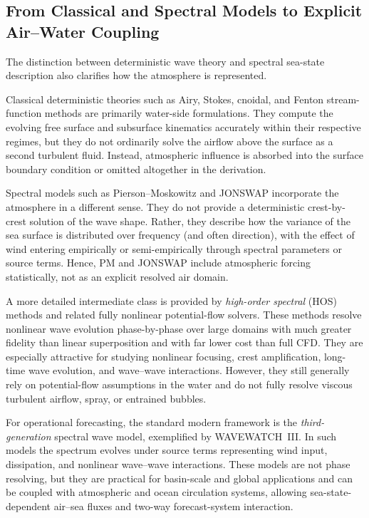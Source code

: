 \documentclass[journal,10pt,twocolumn]{IEEEtran}
\begin{document}
\subsection{From Classical and Spectral Models to Explicit Air--Water Coupling}
\label{sec:moderncoupling}

The distinction between deterministic wave theory and spectral sea-state description also
clarifies how the atmosphere is represented.

Classical deterministic theories such as Airy, Stokes, cnoidal, and Fenton stream-function
methods are primarily water-side formulations.
They compute the evolving free surface and subsurface kinematics accurately within their
respective regimes, but they do not ordinarily solve the airflow above the surface as a
second turbulent fluid.
Instead, atmospheric influence is absorbed into the surface boundary condition or omitted
altogether in the derivation.

Spectral models such as Pierson--Moskowitz and JONSWAP incorporate the atmosphere in a
different sense.
They do not provide a deterministic crest-by-crest solution of the wave shape.
Rather, they describe how the variance of the sea surface is distributed over frequency
(and often direction), with the effect of wind entering empirically or semi-empirically
through spectral parameters or source terms.
Hence, PM and JONSWAP include atmospheric forcing statistically, not as an explicit
resolved air domain.

A more detailed intermediate class is provided by \emph{high-order spectral} (HOS)
methods and related fully nonlinear potential-flow solvers.
These methods resolve nonlinear wave evolution phase-by-phase over large domains with much
greater fidelity than linear superposition and with far lower cost than full CFD.
They are especially attractive for studying nonlinear focusing, crest amplification,
long-time wave evolution, and wave--wave interactions.
However, they still generally rely on potential-flow assumptions in the water and do not
fully resolve viscous turbulent airflow, spray, or entrained bubbles.

For operational forecasting, the standard modern framework is the \emph{third-generation}
spectral wave model, exemplified by WAVEWATCH~III.
In such models the spectrum evolves under source terms representing wind input,
dissipation, and nonlinear wave--wave interactions.
These models are not phase resolving, but they are practical for basin-scale and global
applications and can be coupled with atmospheric and ocean circulation systems, allowing
sea-state-dependent air--sea fluxes and two-way forecast-system interaction.
\end{document}
